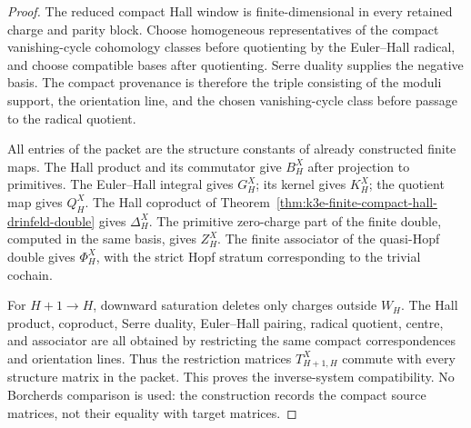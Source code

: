 \begin{proof}
The reduced compact Hall window is finite-dimensional in every
retained charge and parity block. Choose homogeneous representatives
of the compact vanishing-cycle cohomology classes before quotienting by
the Euler--Hall radical, and choose compatible bases after quotienting.
Serre duality supplies the negative basis. The compact provenance is
therefore the triple consisting of the moduli support, the orientation
line, and the chosen vanishing-cycle class before passage to the
radical quotient.

All entries of the packet are the structure constants of already
constructed finite maps. The Hall product and its commutator give
\(B_H^X\) after projection to primitives. The Euler--Hall integral gives
\(G_H^X\); its kernel gives \(K_H^X\); the quotient map gives
\(Q_H^X\). The Hall coproduct of
Theorem~\ref{thm:k3e-finite-compact-hall-drinfeld-double} gives
\(\Delta_H^X\). The primitive zero-charge part of the finite double,
computed in the same basis, gives \(Z_H^X\). The finite associator of
the quasi-Hopf double gives \(\Phi_H^X\), with the strict Hopf stratum
corresponding to the trivial cochain.

For \(H+1\to H\), downward saturation deletes only charges outside
\(W_H\). The Hall product, coproduct, Serre duality, Euler--Hall
pairing, radical quotient, centre, and associator are all obtained by
restricting the same compact correspondences and orientation lines.
Thus the restriction matrices \(T_{H+1,H}^X\) commute with every
structure matrix in the packet. This proves the inverse-system
compatibility. No Borcherds comparison is used: the construction
records the compact source matrices, not their equality with target
matrices.
\end{proof}

